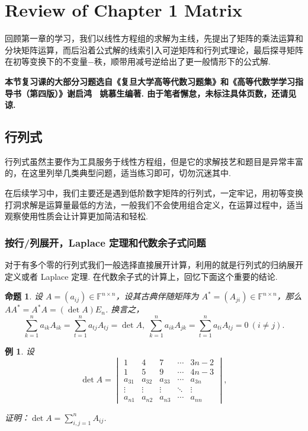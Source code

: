 \documentclass[10pt,openany]{article}
\theoremstyle{thmstyle} %
\theoremstyle{defstyle} %
\theoremstyle{prostyle} %
\newtheorem{proposition}[theorem]{命题}
\theoremstyle{exastyle}
\newtheorem{example}[theorem]{例}
\theoremstyle{remstyle}
\newcommand{\F}{\mathbb{F}}
\newcommand{\n}{^{n \times n}}
\begin{document}
\pagestyle{fancy}
\rhead{\today}

\setcounter{section}{3}

\section{Review of Chapter 1 Matrix}

回顾第一章的学习，我们以线性方程组的求解为主线，先提出了矩阵的乘法运算和分块矩阵运算，而后沿着公式解的线索引入可逆矩阵和行列式理论，最后探寻矩阵在初等变换下的不变量\(-\)秩，顺带用减号逆给出了更一般情形下的公式解.

\textbf{本节复习课的大部分习题选自《复旦大学高等代数习题集》和《高等代数学学习指导书（第四版）》谢启鸿 \ 姚慕生编著. 由于笔者懈怠，未标注具体页数，还请见谅. }

\subsection{行列式}

行列式虽然主要作为工具服务于线性方程组，但是它的求解技艺和题目是异常丰富的，在这里列举几类典型问题，适当练习即可，切勿沉迷其中.

在后续学习中，我们主要还是遇到低阶数字矩阵的行列式，一定牢记，用初等变换打洞求解是运算量最低的方法，一般我们不会使用组合定义，在运算过程中，适当观察使用性质会让计算更加简洁和轻松.

\subsubsection{按行/列展开，Laplace 定理和代数余子式问题}

对于有多个零的行列式我们一般选择直接展开计算，利用的就是行列式的归纳展开定义或者 Laplace 定理. 在代数余子式的计算上，回忆下面这个重要的结论.

\begin{proposition}
	设 \( A=(a_{ij}) \in \F\n \)，设其古典伴随矩阵为 \( A^*=(A_{ji}) \in \F\n \)，那么 \( AA^*=A^*A=(\det A)E_n \). 换言之，
	\[ \sum_{k=1}^{n} a_{ik}A_{ik}= \sum_{t=1}^{n} a_{tj}A_{tj}=\det A, \; \sum_{k=1}^{n} a_{ik}A_{jk}= \sum_{t=1}^{n} a_{ti}A_{tj}= 0 \ (i \neq j). \]
\end{proposition}

\begin{example} \label{4.1.2}
	设 
	\[ \det A = \begin{vmatrix}
		1 & 4 & 7 & \cdots & 3n-2 \\
		1 & 5 & 9 & \cdots & 4n-3 \\
		a_{31} & a_{32} & a_{33} & \cdots & a_{3n} \\
		\vdots & \vdots & \vdots & \ddots & \vdots \\
		a_{n1} & a_{n2} & a_{n3} & \cdots & a_{nn}
	\end{vmatrix}, \]
	
	证明：\( \det A= \sum_{i,j=1}^{n} A_{ij} \).
\end{example}
\end{document}

